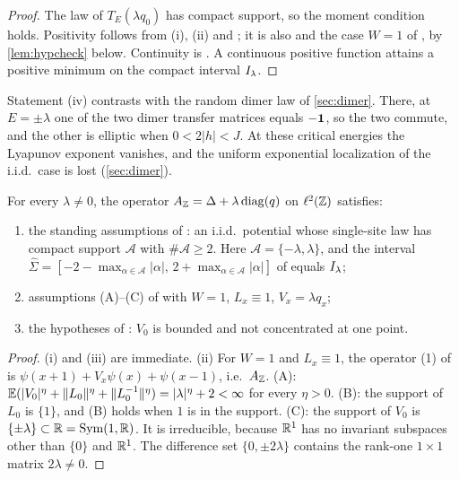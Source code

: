 \begin{proof}
The law of $T_E(\lambda q_0)$ has compact support, so the moment condition holds.  Positivity follows
from (i), (ii) and \cite[Thm.~2.1]{Bucaj2019}; it is also \cite[Thm.~2.3]{Bucaj2019} and the case $W=1$
of \cite[Cor.~3.2]{MaceraSodin2022}, by \cref{lem:hypcheck} below.  Continuity is
\cite[Thm.~2.6]{Bucaj2019}.  A continuous positive function attains a positive minimum on the compact
interval $I_\lambda$.
\end{proof}

\begin{remark}
Statement (iv) contrasts with the random dimer law of \cref{sec:dimer}.  There, at $E=\pm\lambda$
one of the two dimer transfer matrices equals $-\mathbf{1}$, so the two commute, and the other is elliptic
when $0<2|h|<J$.  At these critical energies the Lyapunov exponent vanishes, and the uniform
exponential localization of the i.i.d.\ case is lost (\cref{sec:dimer}).
\end{remark}

\begin{lemma}\label{lem:hypcheck}
For every $\lambda\ne0$, the operator $A_{\mathbb{Z}}=\Delta+\lambda\operatorname{diag}(q)$ on $\ell^2(\mathbb{Z})$ satisfies:
\begin{enumerate}[label=(\roman*)]
\item the standing assumptions of \cite[Def.~2.2]{Bucaj2019}: an i.i.d.\ potential whose single-site law
has compact support $\mathcal A$ with $\#\mathcal A\ge2$.  Here $\mathcal A=\{-\lambda,\lambda\}$, and the
interval $\hat\Sigma=[-2-\max_{\alpha\in\mathcal A}|\alpha|,\,2+\max_{\alpha\in\mathcal A}|\alpha|]$ of
\cite[Sect.~3]{Bucaj2019} equals $I_\lambda$;
\item assumptions (A)--(C) of \cite{MaceraSodin2022} with $W=1$, $L_x\equiv1$, $V_x=\lambda q_x$;
\item the hypotheses of \cite[Thm.~1.1]{Macera2023}: $V_0$ is bounded and not concentrated at one point.
\end{enumerate}
\end{lemma}

\begin{proof}
(i) and (iii) are immediate.  (ii) For $W=1$ and $L_x\equiv1$, the operator (1) of
\cite{MaceraSodin2022} is $\psi(x+1)+V_x\psi(x)+\psi(x-1)$, i.e.\ $A_{\mathbb{Z}}$.  (A):
$\mathbb{E}(|V_0|^\eta+\|L_0\|^\eta+\|L_0^{-1}\|^\eta)=|\lambda|^\eta+2<\infty$ for every $\eta>0$.  (B): the support of
$L_0$ is $\{1\}$, and (B) holds when $1$ is in the support.  (C): the support of $V_0$ is
$\{\pm\lambda\}\subset\mathbb{R}=\mathrm{Sym}(1,\mathbb{R})$.  It is irreducible, because $\mathbb{R}^1$ has no invariant
subspaces other than $\{0\}$ and $\mathbb{R}^1$.  The difference set $\{0,\pm2\lambda\}$ contains the rank-one
$1\times1$ matrix $2\lambda\neq0$.
\end{proof}

